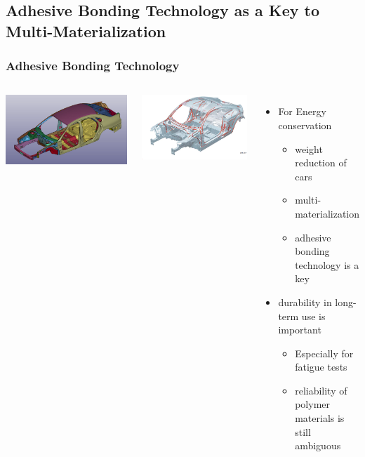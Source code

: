 \documentclass[12pt, dvipdfmx]{beamer}
\begin{document}
\subsection{Adhesive Bonding Technology as a Key to Multi-Materialization}
\begin{frame}
    \frametitle{Adhesive Bonding Technology}
		\begin{columns}[T, onlytextwidth]
					\centering
						\includegraphics[width=\textwidth]{adhesive_car2.png}

						\vspace{5mm}
						\includegraphics[width=\textwidth]{adhesive_car.png}
				
			\begin{itemize}
				\item For {\color{red}Energy conservation}
					\begin{itemize}
						\item weight reduction of cars
						\item multi-materialization
						\item adhesive bonding technology is a key
					\end{itemize}
				\item durability in long-term use is important
					\begin{itemize}
						\item Especially for fatigue tests
						\item reliability of polymer materials is still ambiguous
					\end{itemize}
			\end{itemize}
			

\end{columns}
\end{frame}
\end{document}
